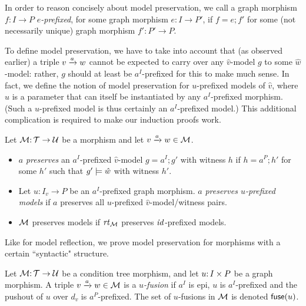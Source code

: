 In order to reason concisely about model preservation, we call a graph morphism $f:I\to P$ \emph{$e$-prefixed}, for some graph morphism $e:I\to P'$, if $f=e;f'$ for some (not necessarily unique) graph morphism $f':P'\to P$.

To define model preservation, we have to take into account that (as observed earlier) a triple ${v}\xrightarrow{a}{w}$ cannot be expected to carry over any $\hat v$-model $g$ to some $\hat w$-model: rather, $g$ should at least be $a^I$-prefixed for this to make much sense. In fact, we define the notion of model preservation for $u$-prefixed models of $\hat v$, where $u$ is a parameter that can itself be instantiated by any $a^I$-prefixed morphism. (Such a $u$-prefixed model is thus certainly an $a^I$-prefixed model.) This additional complication is required to make our induction proofs work.
%
\begin{definition}
Let ${\mathcal{M}}{:}\, {\mathcal{T}}\rightarrow{\mathcal{U}}$ be a morphism and let ${v}\xrightarrow{a}{w}\in{\mathcal{M}}$.
\begin{itemize}[topsep=\smallskipamount]
\item $a$ \emph{preserves} an $a^I$-prefixed $\hat v$-model $g=a^I;g'$ with witness $h$ if $h=a^P;h'$ for some $h'$ such that $g'\models \hat w$ with witness $h'$.
		
\item Let $u:I_v\to P$ be an $a^I$-prefixed graph morphism. $a$ \emph{preserves $u$-prefixed models} if $a$ preserves all $u$-prefixed $\hat v$-model/witness pairs.
		
\item ${\mathcal{M}}$ preserves models if $\mathit{rt}_{{\mathcal{M}}}$ preserves ${\mathit{id}}$-prefixed models.
\end{itemize}
\end{definition}
%
Like for model reflection, we prove model preservation for morphisms with a certain ``syntactic" structure.

\begin{definition}
Let ${\mathcal{M}}{:}\, {\mathcal{T}}\rightarrow{\mathcal{U}}$ be a condition tree morphism, and let $u{:}\, I\times P$ be a graph morphism. A triple ${v}\xrightarrow{a}{w}\in{\mathcal{M}}$ is a \emph{$u$-fusion} if $a^I$ is epi, $u$ is $a^I$-prefixed and the pushout of $u$ over $d_v$ is $a^P$-prefixed. The set of $u$-fusions in ${\mathcal{M}}$ is denoted ${\mathsf{fuse}}(u)$.
\end{definition}

